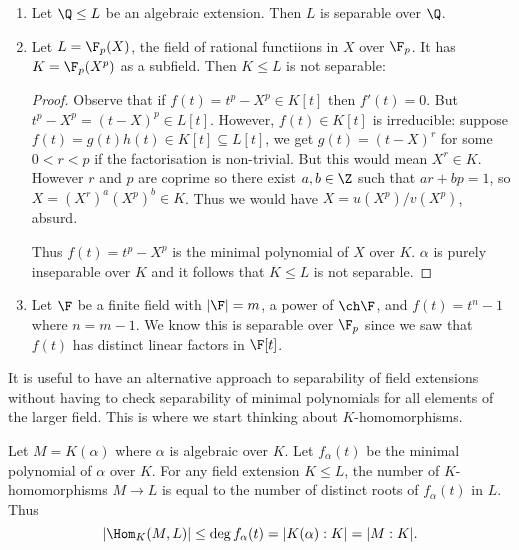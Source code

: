 \documentclass[a4paper]{article}
\begin{document}
\begin{eg}\leavevmode
  \begin{enumerate}
  \item Let \(\Q \leq L\) be an algebraic extension. Then \(L\) is separable over \(\Q\).
  \item Let \(L = \F_p(X)\), the field of rational functiions in \(X\) over \(\F_p\). It has \(K = \F_p(X^p)\) as a subfield. Then \(K \leq L\) is not separable:
    \begin{proof}
      Observe that if \(f(t) = t^p - X^p \in K[t]\) then \(f'(t) = 0\). But \(t^p - X^p = (t - X)^p \in L[t]\). However, \(f(t) \in K[t]\) is irreducible: suppose \(f(t) = g(t)h(t) \in K[t] \subseteq L[t]\), we get \(g(t) = (t - X)^r\) for some \(0 < r < p\) if the factorisation is non-trivial. But this would mean \(X^r \in K\). However \(r\) and \(p\) are coprime so there exist \(a, b \in \Z\) such that \(ar + bp = 1\), so \(X = (X^r)^a (X^p)^b \in K\). Thus we would have \(X = u(X^p)/v(X^p)\), absurd.

      Thus \(f(t) = t^p - X^p\) is the minimal polynomial of \(X\) over \(K\). \(\alpha\) is purely inseparable over \(K\) and it follows that \(K \leq L\) is not separable.
    \end{proof}
  \item Let \(\F\) be a finite field with \(|\F| = m\), a power of \(\ch \F\), and \(f(t) = t^n - 1\) where \(n = m - 1\). We know this is separable over \(\F_p\) since we saw that \(f(t)\) has distinct linear factors in \(\F[t]\).
  \end{enumerate}
\end{eg}

\begin{remark}
  It is useful to have an alternative approach to separability of field extensions without having to check separability of minimal polynomials for all elements of the larger field. This is where we start thinking about \(K\)-homomorphisms.
\end{remark}

\begin{lemma}
  \label{lem:homomophism of algebraic extension}
  Let \(M = K(\alpha)\) where \(\alpha\) is algebraic over \(K\). Let \(f_\alpha(t)\) be the minimal polynomial of \(\alpha\) over \(K\). For any field extension \(K \leq L\), the number of \(K\)-homomorphisms \(M \to L\) is equal to the number of distinct roots of \(f_\alpha(t)\) in \(L\). Thus
  \[
    |\Hom_K(M, L)| \leq \deg f_\alpha(t) = |K(\alpha):K| = |M:K|.
  \]
\end{lemma}
\end{document}
